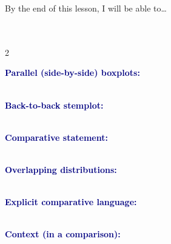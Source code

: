 \documentclass[10pt]{article}
\newcommand{\vocabterm}[1]{%
  \par\noindent\textbf{\textcolor{navy}{#1:}}\\[1pt]%
  \writeline\\[1pt]\writeline\par\vspace{3pt}}
\begin{document}

\vspace{0.10in}

\begin{objectivebox}
\small By the end of this lesson, I will be able to\dots\\[4pt]
\writeline\\[1pt]
\writeline\\[1pt]
\writeline
\end{objectivebox}

\vspace{0.10in}

\boxguard
\begin{vocabbox}
\small
\begin{multicols}{2}
\vocabterm{Parallel (side-by-side) boxplots}
\vocabterm{Back-to-back stemplot}
\vocabterm{Comparative statement}
\columnbreak
\vocabterm{Overlapping distributions}
\vocabterm{Explicit comparative language}
\vocabterm{Context (in a comparison)}
\end{multicols}
\end{vocabbox}

\vspace{0.10in}
\end{document}
